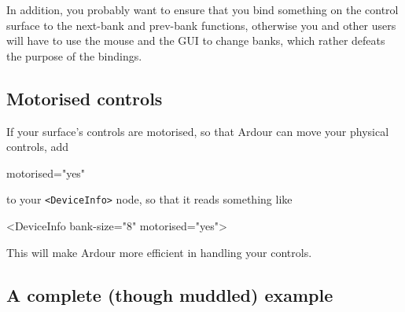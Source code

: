 \documentclass[10pt,a4paper]{book}
\begin{document}
{In addition, you probably want to ensure that you bind something on
the control surface to the next-bank and prev-bank functions,
otherwise you and other users will have to use the mouse and the GUI
to change banks, which rather defeats the purpose of the bindings.

\subsection{Motorised controls}

If your surface's controls are motorised, so that Ardour can move your physical controls,
add

\begin{listing}
motorised="yes"
\end{listing}

to your \texttt{<DeviceInfo>} node, so that it reads something like

\begin{listing}
<DeviceInfo bank-size="8" motorised="yes">
\end{listing}

This will make Ardour more efficient in handling your controls.

\subsection{A complete (though muddled) example}

}
\end{document}
